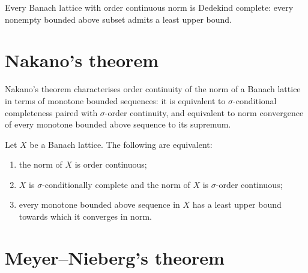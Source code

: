 \begin{theorem}
\label{thm:conditionallyCompleteLatticeOf-isOrderContinuousNorm}
\leanok
{}
Every Banach lattice with order continuous norm is Dedekind
complete: every nonempty bounded above subset admits a least
upper bound.
\end{theorem}

\section{Nakano's theorem}

Nakano's theorem characterises order continuity of the norm of a
Banach lattice in terms of monotone bounded sequences: it is
equivalent to $\sigma$-conditional completeness paired with
$\sigma$-order continuity, and equivalent to norm convergence of
every monotone bounded above sequence to its supremum.

\begin{theorem}
\label{thm:isOrderContinuousNorm-tfae}
\leanok
{}
Let $X$ be a Banach lattice. The following are equivalent:
\begin{enumerate}
  \item the norm of $X$ is order continuous;
  \item $X$ is $\sigma$-conditionally complete and the norm of $X$
    is $\sigma$-order continuous;
  \item every monotone bounded above sequence in $X$ has a least
    upper bound towards which it converges in norm.
\end{enumerate}
\end{theorem}

\section{Meyer--Nieberg's theorem}

